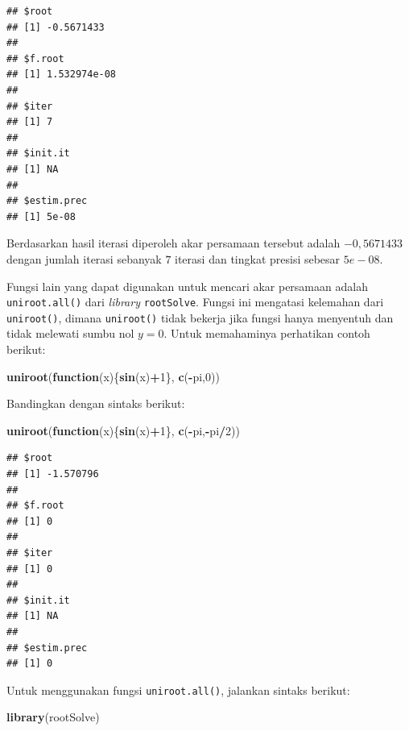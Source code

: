\documentclass[]{book}
\newenvironment{Shaded}{\begin{snugshade}}{\end{snugshade}}
\newcommand{\ControlFlowTok}[1]{\textcolor[rgb]{0.13,0.29,0.53}{\textbf{#1}}}
\newcommand{\DecValTok}[1]{\textcolor[rgb]{0.00,0.00,0.81}{#1}}
\newcommand{\KeywordTok}[1]{\textcolor[rgb]{0.13,0.29,0.53}{\textbf{#1}}}
\newcommand{\NormalTok}[1]{#1}
\newcommand{\OperatorTok}[1]{\textcolor[rgb]{0.81,0.36,0.00}{\textbf{#1}}}
\theoremstyle{definition}
\theoremstyle{definition}
\theoremstyle{definition}
\theoremstyle{remark}
\begin{document}
\begin{verbatim}
## $root
## [1] -0.5671433
## 
## $f.root
## [1] 1.532974e-08
## 
## $iter
## [1] 7
## 
## $init.it
## [1] NA
## 
## $estim.prec
## [1] 5e-08
\end{verbatim}

Berdasarkan hasil iterasi diperoleh akar persamaan tersebut adalah \(-0,5671433\) dengan jumlah iterasi sebanyak \(7\) iterasi dan tingkat presisi sebesar \(5e-08\).

Fungsi lain yang dapat digunakan untuk mencari akar persamaan adalah \texttt{uniroot.all()} dari \emph{library} \texttt{rootSolve}. Fungsi ini mengatasi kelemahan dari \texttt{uniroot()}, dimana \texttt{uniroot()} tidak bekerja jika fungsi hanya menyentuh dan tidak melewati sumbu nol \(y=0\). Untuk memahaminya perhatikan contoh berikut:

\begin{Shaded}
\begin{Highlighting}[]
\KeywordTok{uniroot}\NormalTok{(}\ControlFlowTok{function}\NormalTok{(x)\{}\KeywordTok{sin}\NormalTok{(x)}\OperatorTok{+}\DecValTok{1}\NormalTok{\}, }\KeywordTok{c}\NormalTok{(}\OperatorTok{-}\NormalTok{pi,}\DecValTok{0}\NormalTok{))}
\end{Highlighting}
\end{Shaded}

Bandingkan dengan sintaks berikut:

\begin{Shaded}
\begin{Highlighting}[]
\KeywordTok{uniroot}\NormalTok{(}\ControlFlowTok{function}\NormalTok{(x)\{}\KeywordTok{sin}\NormalTok{(x)}\OperatorTok{+}\DecValTok{1}\NormalTok{\}, }\KeywordTok{c}\NormalTok{(}\OperatorTok{-}\NormalTok{pi,}\OperatorTok{-}\NormalTok{pi}\OperatorTok{/}\DecValTok{2}\NormalTok{))}
\end{Highlighting}
\end{Shaded}

\begin{verbatim}
## $root
## [1] -1.570796
## 
## $f.root
## [1] 0
## 
## $iter
## [1] 0
## 
## $init.it
## [1] NA
## 
## $estim.prec
## [1] 0
\end{verbatim}

Untuk menggunakan fungsi \texttt{uniroot.all()}, jalankan sintaks berikut:

\begin{Shaded}
\begin{Highlighting}[]
\KeywordTok{library}\NormalTok{(rootSolve)}
\end{Highlighting}
\end{Shaded}
\end{document}
